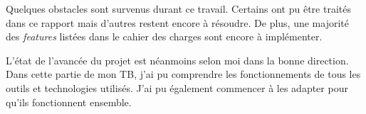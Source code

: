 


Quelques obstacles sont survenus durant ce travail. Certains ont pu être traités dans ce rapport mais d'autres restent encore à résoudre. De plus, une majorité des \textit{features} listées dans le cahier des charges sont encore à implémenter.

L'état de l'avancée du projet est néanmoins selon moi dans la bonne direction. Dans cette partie de mon TB, j'ai pu comprendre les fonctionnements de tous les outils et technologies utilisés. J'ai pu également commencer à les adapter pour qu'ils fonctionnent ensemble. 

\vfil
\hspace{8cm}\makeatletter\@author\makeatother\par
\hspace{8cm}\begin{minipage}{5cm}
    \printsignature
\end{minipage}